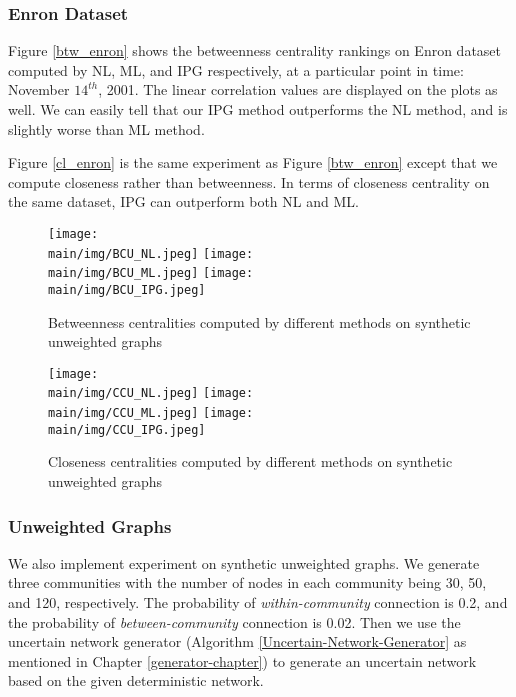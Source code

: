 \documentclass[\main/thesis.tex]{subfiles}
\begin{document}
\subsubsection{Enron Dataset}
Figure \ref{btw_enron} shows the betweenness centrality rankings on Enron dataset computed by NL, ML, and IPG respectively, at a particular point in time: November $14^{th}$, 2001. The linear correlation values are displayed on the plots as well. We can easily tell that our IPG method outperforms the NL method, and is slightly worse than ML method.

Figure \ref{cl_enron} is the same experiment as Figure \ref{btw_enron} except that we compute closeness rather than betweenness. In terms of closeness centrality on the same dataset, IPG can outperform both NL and ML.

\begin{figure}
\texttt{[image: \\main/img/BCU\_NL.jpeg]}
\texttt{[image: \\main/img/BCU\_ML.jpeg]}
\centering
\texttt{[image: \\main/img/BCU\_IPG.jpeg]}
\caption{Betweenness centralities computed by different methods on synthetic unweighted graphs}
\label{btw_unweighted}
\end{figure}

\begin{figure}
\texttt{[image: \\main/img/CCU\_NL.jpeg]}
\texttt{[image: \\main/img/CCU\_ML.jpeg]}
\centering
\texttt{[image: \\main/img/CCU\_IPG.jpeg]}
\caption{Closeness centralities computed by different methods on synthetic unweighted graphs}
\label{cl_unweighted}
\end{figure}

\subsubsection{Unweighted Graphs} \label{Unweighted-Graphs-Experiment}
We also implement experiment on synthetic unweighted graphs. We generate three communities with the number of nodes in each community being 30, 50, and 120, respectively. The probability of \textit{within-community} connection is 0.2, and the probability of \textit{between-community} connection is 0.02. Then we use the uncertain network generator (Algorithm \ref{Uncertain-Network-Generator} as mentioned in Chapter \ref{generator-chapter}) to generate an uncertain network based on the given deterministic network. %
\end{document}
